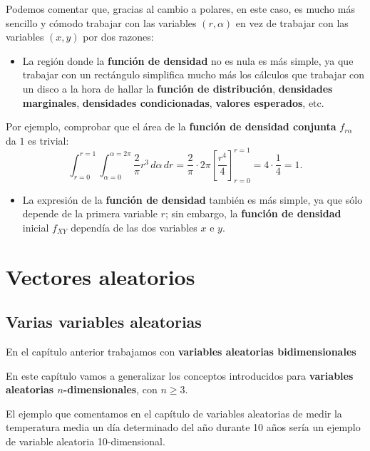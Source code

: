 \documentclass[]{book}
\providecommand{\tightlist}{%
  \setlength{\itemsep}{0pt}\setlength{\parskip}{0pt}}
\begin{document}
Podemos comentar que, gracias al cambio a polares, en este caso, es mucho más sencillo y cómodo trabajar con las variables \((r,\alpha)\) en vez de trabajar con las variables \((x,y)\) por dos razones:

\begin{itemize}
\tightlist
\item
  La región donde la \textbf{función de densidad} no es nula es más simple, ya que trabajar con un rectángulo simplifica mucho más los cálculos que trabajar con un disco a la hora de hallar la \textbf{función de distribución}, \textbf{densidades marginales}, \textbf{densidades condicionadas}, \textbf{valores esperados}, etc.
\end{itemize}

Por ejemplo, comprobar que el área de la \textbf{función de densidad conjunta} \(f_{r\alpha}\) da \(1\) es trivial:
\[
\int_{r=0}^{r=1}\int_{\alpha =0}^{\alpha =2\pi}\frac{2}{\pi} r^3\, d\alpha\, dr = \frac{2}{\pi}\cdot 2\pi \left[\frac{r^4}{4}\right]_{r=0}^{r=1}=4\cdot \frac{1}{4}=1.
\]

\begin{itemize}
\tightlist
\item
  La expresión de la \textbf{función de densidad} también es más simple, ya que sólo depende de la primera variable \(r\); sin embargo, la \textbf{función de densidad} inicial \(f_{XY}\) dependía de las dos variables \(x\) e \(y\).
\end{itemize}

\hypertarget{vectores-aleatorios}{%
\chapter{Vectores aleatorios}\label{vectores-aleatorios}}

\hypertarget{varias-variables-aleatorias}{%
\section{Varias variables aleatorias}\label{varias-variables-aleatorias}}

En el capítulo anterior trabajamos con \textbf{variables aleatorias bidimensionales}

En este capítulo vamos a generalizar los conceptos introducidos para \textbf{variables aleatorias \(n\)-dimensionales}, con \(n\geq 3\).

El ejemplo que comentamos en el capítulo de variables aleatorias de medir la temperatura media un día determinado del año durante 10 años sería un ejemplo de variable aleatoria 10-dimensional.
\end{document}
